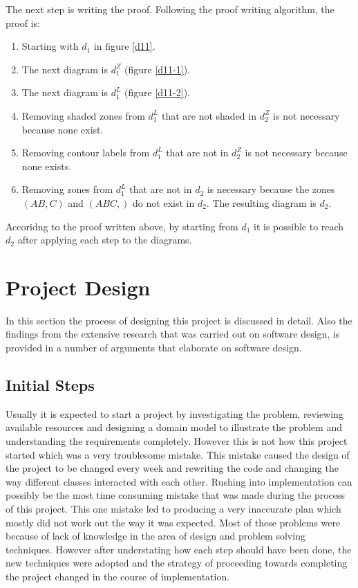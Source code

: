 \documentclass[10pt, a4paper, titlepage]{article}
\begin{document}
The next step is writing the proof. Following the proof writing algorithm, the proof is:

\begin{enumerate}
\item Starting with $ d_{1} $ in figure \ref{d11}.
\item The next diagram is $ d^Z_{1} $ (figure \ref{d11-1}).
\item The next diagram is $ d^L_{1} $ (figure \ref{d11-2}).
\item Removing shaded zones from $ d^L_{1} $ that are not shaded in $ d^Z_{2} $ is not necessary because none exist.
\item Removing contour labels from $ d^L_{1} $ that are not in $ d^Z_{2} $ is not necessary because none exists.
\item Removing zones from $ d^L_{1} $ that are not in $ d_{2} $ is necessary because the zones $ (AB, C) $ and $ (ABC, ) $ do not exist in $ d_{2} $. The resulting diagram is $ d_{2} $. 
\end{enumerate}

Accoridng to the proof written above, by starting from $ d_{1} $ it is possible to reach $ d_{2} $ after applying each step to the diagrams.


\newpage
\section{Project Design}
\label{sec:design}

In this section the process of designing this project is discussed in detail. Also the findings from the extensive research that was carried out on software design, is provided in a number of arguments that elaborate on software design.
 
\subsection{Initial Steps}
Usually it is expected to start a project by investigating the problem, reviewing available resources and designing a domain model to illustrate the problem and understanding the requirements completely. However this is not how this project started which was a very troublesome mistake. This mistake caused the design of the project to be changed every week and rewriting the code and changing the way different classes interacted with each other. Rushing into implementation can possibly be the most time consuming mistake that was made during the process of this project. This one mistake led to producing a very inaccurate plan which mostly did not work out the way it was expected. Most of these problems were because of lack of knowledge in the area of design and problem solving techniques. However after understating how each step should have been done, the new techniques were adopted and the strategy of proceeding towards completing the project changed in the course of implementation.
\end{document}
